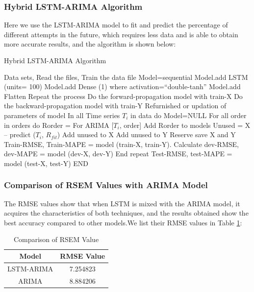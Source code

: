 \documentclass[12pt]{article}  %
\begin{document}
\subsubsection{Hybrid LSTM-ARIMA Algorithm}
Here we use the LSTM-ARIMA model to fit and predict the percentage of different attempts in the future, which requires less data and is able to obtain more accurate results, and the algorithm is shown below:
\begin{algorithm}
\caption{Hybrid LSTM-ARIMA Algorithm}
Data sets,
Read the files,
Train the data file\;
Model=sequential\;
\quad Model.add LSTM (units= 100)\;
\quad Model.add Dense (1) where activation=``double-tanh''\;
\quad Model.add Flatten\;
Repeat the process\;
\quad Do the forward-propagation model with train-X\;
\quad Do the backward-propagation model with train-Y\;
\quad Refurnished or updation of parameters of model\;
\quad In all Time series $T_i$ in data do\;
Model=NULL\;
For all order in orders do\;
\quad Rorder = For ARIMA [$T_i$, order]\;
\quad Add Rorder to models\;
Unused = X – predict ($T_i$, $R_{fit}$)\;
\quad Add unused to X\;
\quad Add unused to Y\;
\quad Reserve save X and Y\;
Train-RMSE, Train-MAPE = model (train-X, train-Y).\;
\quad Calculate dev-RMSE, dev-MAPE = model (dev-X, dev-Y)\;
End repeat\;
Test-RMSE, test-MAPE = model (test-X, test-Y)\;
END
\end{algorithm}
\subsubsection{Comparison of RSEM Values with ARIMA Model}
The RMSE values show that when LSTM is mixed with the ARIMA model, it acquires the characteristics of both techniques, and the results obtained show the best accuracy compared to other models.We list their RMSE values in Table \ref {rmse}:
\begin{table}[!h]
\begin{center}
\caption{Comparison of RSEM Value}\label{rmse}
\begin{tabular}{cc}
	\hline
\textbf{Model} & \textbf{RMSE Value}                                           \\ \hline
LSTM-ARIMA          & 7.254823                                                         \\
ARIMA     & 8.884206 \\ \hline
\end{tabular}
\end{center}
\end{table}
\end{document}
